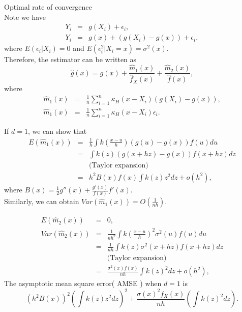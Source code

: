 \documentclass[a4paper,11pt]{article}
\begin{document}
Optimal rate of convergence\\
Note we have
\begin{eqnarray*}
Y_i &=& g(X_i) + \epsilon_i, \\
Y_i &=& g(x) + (g(X_i) - g(x)) + \epsilon_i,
\end{eqnarray*}
where $E(\epsilon_i | X_i) = 0$ and $E(\epsilon^2_i | X_i = x) = \sigma^2(x)$. \\
Therefore, the estimator can be written as
\begin{equation*}
\hat{g}(x) = g(x) + \frac{\hat{m}_{1}(x)}{\hat{f}_{X}(x)} + \frac{\hat{m}_{2}(x)}{\hat{f}(x)},
\end{equation*}
where
\begin{eqnarray*}
\hat{m}_{1}(x) &=&  \frac{1}{n} \sum_{i = 1}^{n} \kappa_{H}(x - X_i)  (g(X_i) - g(x)), \\
\hat{m}_{1}(x) &=&  \frac{1}{n} \sum_{i = 1}^{n} \kappa_{H}(x - X_i)  \epsilon_i.
\end{eqnarray*}

If $d=1$, we can show that
\begin{eqnarray*}
E(\hat{m}_{1}(x)) &=& \frac{1}{h} \int k \left( \frac{x-u}{h} \right) (g(u) - g(x)) f(u) du\\
&=& \int k(z) (g(x+hz) - g(x)) f(x+hz) dz\\
&& \text{(Taylor expansion)} \\ 
&=& h^2 B(x) f(x) \int k(z) z^2 dz + o(h^2),
\end{eqnarray*}
where $B(x) = \frac{1}{2} g''(x) + \frac{g'(x)}{f(x)} f'(x)$.\\
Similarly, we can obtain $Var( \hat{m}_{1}(x)) = O(\frac{1}{nh})$.

\begin{eqnarray*}
E(\hat{m}_{2}(x)) &=& 0, \\
Var(\hat{m}_{2}(x)) &=& \frac{1}{nh^2} \int k \left( \frac{x-u}{h} \right)^2  \sigma^2(u) f(u) du \\
&=& \frac{1}{nh} \int  k(z) \sigma^2(x+hz) f(x+hz) dz \\
&& \text{(Taylor expansion)} \\
&=& \frac{\sigma^2(x)f(x)}{nh}  \int k(z)^2 dz + o(h^2),
\end{eqnarray*}
The asymptotic mean square error( AMSE ) when $d= 1$ is
\begin{equation*}
\left( h^{2} B(x) \right)^{2} \left( \int k(z) z^{2} dz \right)^{2} +  \frac{ \sigma(x)^{2} f_{X}(x)}{nh}  \left( \int k(z)^2 dz \right).
\end{equation*}
\end{document}
